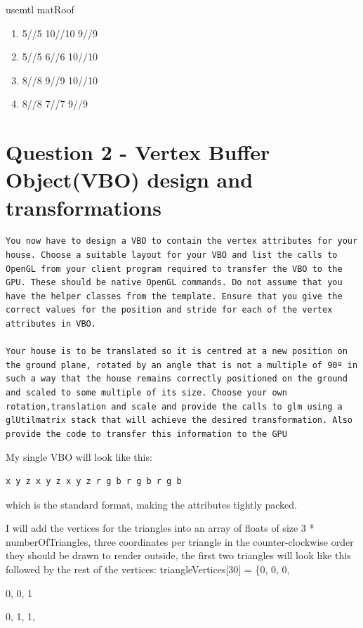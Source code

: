 \documentclass[10pt]{report}
\begin{document}
usemtl matRoof
\begin{enumerate}[f]
    \item 5//5 10//10 9//9
    \item 5//5 6//6 10//10
    \item 8//8 9//9 10//10
    \item 8//8 7//7 9//9
\end{enumerate}


\chapter{Question 2 - Vertex Buffer Object(VBO) design and transformations}
\begin{center}
\begin{verbatim}
You now have to design a VBO to contain the vertex attributes for your house. Choose a suitable layout for your VBO and list the calls to OpenGL from your client program required to transfer the VBO to the GPU. These should be native OpenGL commands. Do not assume that you have the helper classes from the template. Ensure that you give the correct values for the position and stride for each of the vertex attributes in VBO.

Your house is to be translated so it is centred at a new position on the ground plane, rotated by an angle that is not a multiple of 90º in such a way that the house remains correctly positioned on the ground and scaled to some multiple of its size. Choose your own rotation,translation and scale and provide the calls to glm using a glUtilmatrix stack that will achieve the desired transformation. Also provide the code to transfer this information to the GPU
\end{verbatim}
\end{center}

My single VBO will look like this:
\begin{verbatim}
x y z x y z x y z r g b r g b r g b
\end{verbatim}
which is the standard format, making the attributes tightly packed.

I will add the vertices for the triangles into an array of floats of size 3 * numberOfTriangles, three coordinates per triangle in the counter-clockwise order they should be drawn to render outside, the first two triangles will look like this followed by the rest of the vertices:
triangleVertices[30] = 
\{0, 0, 0,

0, 0, 1

0, 1, 1,
\end{document}

